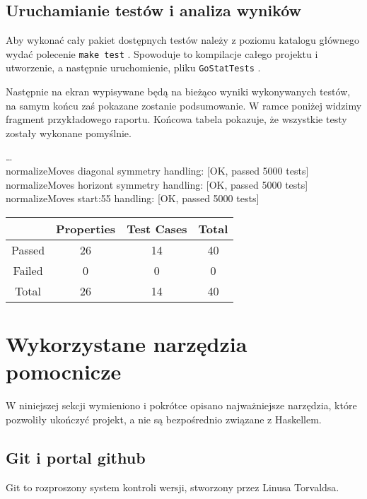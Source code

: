 \documentclass[10pt,leqno]{article}
\newcommand{\cmd}[1]{
  \texttt{#1}
}
\begin{document}
\subsection{Uruchamianie testów i analiza wyników}

Aby wykonać cały pakiet dostępnych testów należy z poziomu katalogu głównego wydać polecenie \cmd{make test}.
Spowoduje to kompilacje całego projektu i utworzenie, a następnie uruchomienie, pliku \cmd{GoStatTests}.

Następnie na ekran wypisywane będą na bieżąco wyniki wykonywanych testów, na samym końcu zaś pokazane zostanie
podsumowanie. W ramce poniżej widzimy fragment przykładowego raportu. Końcowa tabela pokazuje, że wszystkie
testy zostały wykonane pomyślnie.

\begin{framed}
  \noindent \dots \\
  normalizeMoves diagonal symmetry handling: [OK, passed 5000 tests] \\ 
  normalizeMoves horizont symmetry handling: [OK, passed 5000 tests] \\
  normalizeMoves start:55 handling: [OK, passed 5000 tests] \\

\renewcommand{\arraystretch}{1.5}
\begin{tabular}{| c | c | c | c | } \hline
         & Properties &  Test Cases &  Total        \\ \hline
 Passed  & 26         &  14         &  40           \\ \hline
 Failed  & 0          &  0          &  0            \\ \hline
 Total   & 26         &  14         &  40           \\ \hline
\end{tabular}
\end{framed}

\newpage

\section{Wykorzystane narzędzia pomocnicze}

W niniejszej sekcji wymieniono i pokrótce opisano najważniejsze narzędzia, które pozwoliły ukończyć projekt,
a nie są bezpośrednio związane z Haskellem.

\subsection{Git i portal github}
Git \cite{git} to rozproszony system kontroli wersji, stworzony przez Linusa Torvaldsa. 
\end{document}

